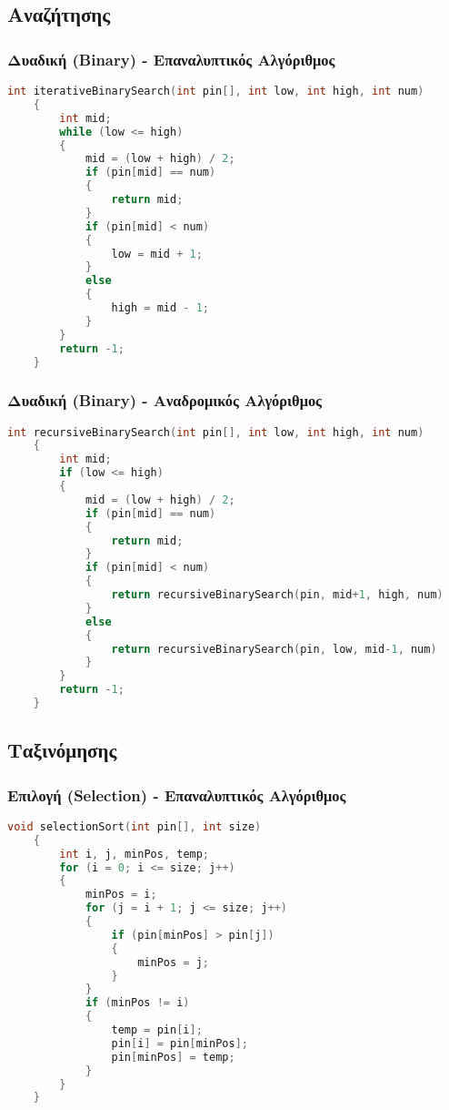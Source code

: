 \documentclass[a4paper,12pt]{article}
\begin{document}
\subsection{Αναζήτησης}
\subsubsection{Δυαδική \textbf{(Binary)} - Επαναλυπτικός Αλγόριθμος}
\begin{lstlisting}[language=c]
    int iterativeBinarySearch(int pin[], int low, int high, int num)
    {
        int mid;
        while (low <= high)
        {
            mid = (low + high) / 2;
            if (pin[mid] == num)
            {
                return mid;
            }
            if (pin[mid] < num)
            {
                low = mid + 1;
            }
            else
            {
                high = mid - 1;
            }
        }
        return -1;
    }
\end{lstlisting}

\subsubsection{Δυαδική \textbf{(Binary)} - Αναδρομικός Αλγόριθμος}
\begin{lstlisting}[language=c]
    int recursiveBinarySearch(int pin[], int low, int high, int num)
    {
        int mid;
        if (low <= high)
        {
            mid = (low + high) / 2;
            if (pin[mid] == num)
            {
                return mid;
            }
            if (pin[mid] < num)
            {
                return recursiveBinarySearch(pin, mid+1, high, num)
            }
            else
            {
                return recursiveBinarySearch(pin, low, mid-1, num)
            }
        }
        return -1;
    }
\end{lstlisting}

\newpage
\subsection{Ταξινόμησης}
\subsubsection{Επιλογή \textbf{(Selection)} - Επαναλυπτικός Αλγόριθμος}
\begin{lstlisting}[language=c]
    void selectionSort(int pin[], int size)
    {
        int i, j, minPos, temp;
        for (i = 0; i <= size; j++)
        {
            minPos = i;
            for (j = i + 1; j <= size; j++)
            {
                if (pin[minPos] > pin[j])
                {
                    minPos = j;
                }
            }
            if (minPos != i)
            {
                temp = pin[i];
                pin[i] = pin[minPos];
                pin[minPos] = temp;
            }
        }
    }
\end{lstlisting}
\end{document}
